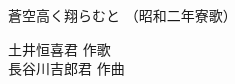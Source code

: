 \documentclass[10pt,b5j]{tarticle} %
\begin{document}
\begin{minipage}[c]{0.7\hsize} %
    \begin{center}
        {\LARGE
            蒼空高く翔らむと %
        }
        {\small 
            （昭和二年寮歌） %
        }
    \end{center}
\end{minipage}
\begin{minipage}[c]{0.3\hsize} %
    \begin{flushright} %
        土井恒喜君 作歌\\長谷川吉郎君 作曲 %
    \end{flushright}
\end{minipage}
\end{document}
